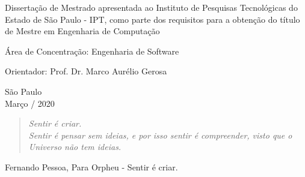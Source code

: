 \documentclass[12pt,twoside,a4paper]{book} %
\begin{document}
    \vskip 2cm

    \hspace{6cm}\begin{minipage}{0.48\linewidth}
	Dissertação de Mestrado apresentada
	ao Instituto de Pesquisas Tecnológicas do\\
	Estado de São Paulo - IPT, como 
	parte dos requisitos para a obtenção do 
	título de Mestre em Engenharia de 
	Computação
    \end{minipage}
    
    \vskip 2cm
    
    \hspace{6cm}\begin{minipage}{0.48\linewidth}
	Área de Concentração: Engenharia de Software
    \end{minipage}
    
    \vskip 2cm
    
    \hspace{6cm}\begin{minipage}{0.48\linewidth}
	Orientador: Prof. Dr. Marco Aurélio Gerosa
    \end{minipage}
    
    \vskip 6cm
    
    \begin{center}
        São Paulo\\
        Março / 2020
    \end{center}

\pagebreak

\newpage
\thispagestyle{empty}

\begin{center}
        \vspace*{6 cm}
        \begin{quote}
            \textit{Sentir é criar.\\
            Sentir é pensar sem ideias, e por isso sentir é compreender, visto que o Universo não tem ideias.}
        \end{quote}
        \begin{flushright}
        Fernando Pessoa, Para Orpheu - Sentir é criar.\\
        \end{flushright}
    \end{center}


\pagebreak


\end{document}

